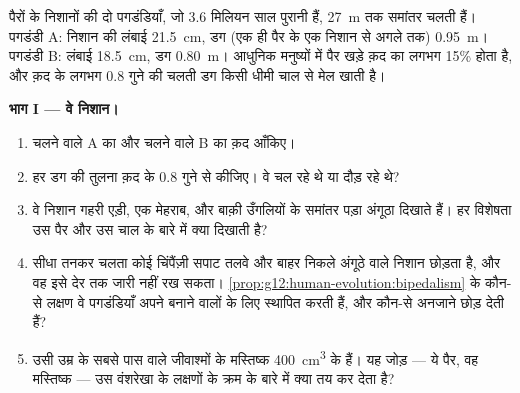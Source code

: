 \begin{problem}
\label{pb:g12:human-evolution:1}
पैरों के निशानों की दो पगडंडियाँ, जो 3.6 मिलियन साल पुरानी हैं, \qty{27}{m}
तक समांतर चलती हैं। पगडंडी A: निशान की लंबाई \qty{21.5}{cm}, डग (एक ही पैर
के एक निशान से अगले तक) \qty{0.95}{m}। पगडंडी B: लंबाई \qty{18.5}{cm}, डग
\qty{0.80}{m}। आधुनिक मनुष्यों में पैर खड़े क़द का लगभग 15\% होता है, और
क़द के लगभग 0.8 गुने की चलती डग किसी धीमी चाल से मेल खाती है।

\medskip
\noindent\textbf{भाग I --- वे निशान।}
\begin{enumerate}
  \item चलने वाले A का और चलने वाले B का क़द आँकिए।
  \item हर डग की तुलना क़द के 0.8 गुने से कीजिए। वे चल रहे थे या दौड़ रहे
        थे?
  \item वे निशान गहरी एड़ी, एक मेहराब, और बाक़ी उँगलियों के समांतर पड़ा
        अंगूठा दिखाते हैं। हर विशेषता उस पैर और उस चाल के बारे में क्या
        दिखाती है?
  \item सीधा तनकर चलता कोई चिंपैंज़ी सपाट तलवे और बाहर निकले अंगूठे वाले
        निशान छोड़ता है, और वह इसे देर तक जारी नहीं रख सकता।
        \cref{prop:g12:human-evolution:bipedalism} के कौन-से लक्षण वे
        पगडंडियाँ अपने बनाने वालों के लिए स्थापित करती हैं, और कौन-से
        अनजाने छोड़ देती हैं?
  \item उसी उम्र के सबसे पास वाले जीवाश्मों के मस्तिष्क \qty{400}{cm^3}
        के हैं। यह जोड़ --- ये पैर, वह मस्तिष्क --- उस वंशरेखा के लक्षणों
        के क्रम के बारे में क्या तय कर देता है?
\end{enumerate}


\end{problem}
